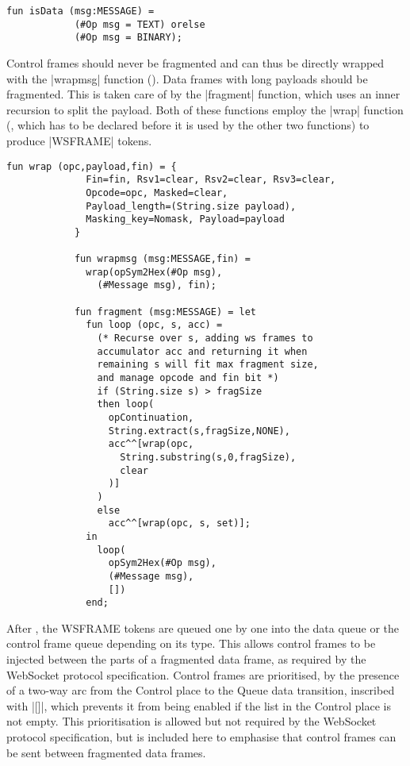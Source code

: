 			\begin{lstlisting}[label=lst:isData,caption=isData,gobble=3,float=h]
			fun isData (msg:MESSAGE) =
			(#Op msg = TEXT) orelse
			(#Op msg = BINARY);
			\end{lstlisting}
			
			Control frames should never be fragmented and can thus be directly wrapped
			with the |wrapmsg| function ().
			Data frames with long payloads should be fragmented. This is taken care of by
			the |fragment| function, which uses an inner recursion to split the payload. 
			Both of these functions employ the |wrap| function (,
			which has to be declared before it is used by the other two functions) to
			produce |WSFRAME| tokens.
			
			
			\begin{lstlisting}[label=lst:fragment,caption=wrap wrapmsg and fragment,gobble=3,float] 
			fun wrap (opc,payload,fin) = { 
			  Fin=fin, Rsv1=clear, Rsv2=clear, Rsv3=clear,
			  Opcode=opc, Masked=clear,
			  Payload_length=(String.size payload),
			  Masking_key=Nomask, Payload=payload
			}
			
			fun wrapmsg (msg:MESSAGE,fin) = 
			  wrap(opSym2Hex(#Op msg), 
			    (#Message msg), fin);
			    
			fun fragment (msg:MESSAGE) = let
			  fun loop (opc, s, acc) = 
			    (* Recurse over s, adding ws frames to 
			    accumulator acc and returning it when 
			    remaining s will fit max fragment size,
			    and manage opcode and fin bit *)
			    if (String.size s) > fragSize
			    then loop(
			      opContinuation,
			      String.extract(s,fragSize,NONE),
			      acc^^[wrap(opc, 
			        String.substring(s,0,fragSize), 
			        clear
			      )]
			    )
			    else 
			      acc^^[wrap(opc, s, set)];
			  in 
			    loop(
			      opSym2Hex(#Op msg), 
			      (#Message msg), 
			      [])
			  end;
			\end{lstlisting}
			
			After , the WSFRAME tokens are queued
			one by one into the data queue or the control frame queue depending on its
			type. This allows control frames to be injected between the parts of a
			fragmented data frame, as required by the WebSocket protocol specification.
			Control frames are prioritised, by the presence of a two-way arc from the
			Control place to the Queue data transition, inscribed with |[]|, which
			prevents it from being enabled if the list in the Control place is not
			empty. This prioritisation is allowed but not required by the WebSocket
			protocol specification, but is included here to emphasise that control
			frames can be sent between fragmented data frames.
		
